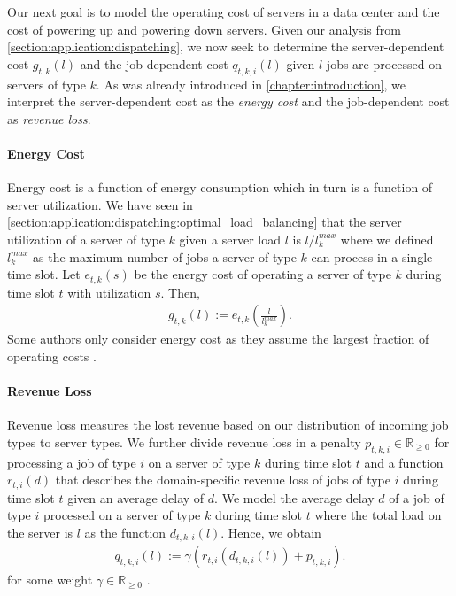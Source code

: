 Our next goal is to model the operating cost of servers in a data center and the cost of powering up and powering down servers. Given our analysis from \autoref{section:application:dispatching}, we now seek to determine the server-dependent cost $g_{t,k}(l)$ and the job-dependent cost $q_{t,k,i}(l)$ given $l$ jobs are processed on servers of type $k$. As was already introduced in \autoref{chapter:introduction}, we interpret the server-dependent cost as the \emph{energy cost} and the job-dependent cost as \emph{revenue loss}.

\paragraph{Energy Cost} Energy cost is a function of energy consumption which in turn is a function of server utilization. We have seen in \autoref{section:application:dispatching:optimal_load_balancing} that the server utilization of a server of type $k$ given a server load $l$ is $l / l_k^{max}$ where we defined $l_k^{max}$ as the maximum number of jobs a server of type $k$ can process in a single time slot. Let $e_{t,k}(s)$ be the energy cost of operating a server of type $k$ during time slot $t$ with utilization $s$. Then, \begin{align*}
    g_{t,k}(l) := e_{t,k}\left(\frac{l}{l_k^{max}}\right).
\end{align*} Some authors only consider energy cost as they assume the largest fraction of operating costs \cite{Bansal2015}.

\paragraph{Revenue Loss} Revenue loss measures the lost revenue based on our distribution of incoming job types to server types. We further divide revenue loss in a penalty $p_{t,k,i} \in \mathbb{R}_{\geq 0}$ for processing a job of type $i$ on a server of type $k$ during time slot $t$ and a function $r_{t,i}(d)$ that describes the domain-specific revenue loss of jobs of type $i$ during time slot $t$ given an average delay of $d$. We model the average delay $d$ of a job of type $i$ processed on a server of type $k$ during time slot $t$ where the total load on the server is $l$ as the function $d_{t,k,i}(l)$. Hence, we obtain \begin{align*}
    q_{t,k,i}(l) := \gamma(r_{t,i}(d_{t,k,i}(l)) + p_{t,k,i}).
\end{align*} for some weight $\gamma \in \mathbb{R}_{\geq 0}$ \cite{Lin2011}.

